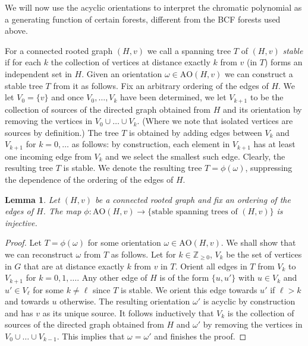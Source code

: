 \documentclass[a4paper,11pt,reqno]{amsart}
\newtheorem{lemma}[corollary]{Lemma}
\numberwithin{equation}{section}
\begin{document}
We will now use the acyclic orientations to interpret the chromatic polynomial as a generating function of certain forests, different from the BCF forests used above.


For a connected rooted graph $(H,v)$ we call a spanning tree $T$ of $(H,v)$ \emph{stable} if for each $k$ the collection of vertices at distance exactly $k$ from $v$ (in $T$) forms an independent set in $H$.
Given an orientation $\omega\in \text{AO}(H,v)$ we can construct a stable tree $T$ from it  as follows.
Fix an arbitrary ordering of the edges of $H$.
We let $V_0=\{v\}$ and once $V_0,\ldots, V_k$ have been determined, we let $V_{k+1}$ to be the collection of sources of the directed graph obtained from $H$ and its orientation by removing the vertices in $V_0\cup \ldots\cup V_k$. (Where we note that isolated vertices are sources by definition.)
The tree $T$ is obtained by adding edges between $V_k$ and $V_{k+1}$ for $k=0,\ldots$ as follows: by construction, each element in $V_{k+1}$ has at least one incoming edge from $V_k$ and we select the smallest such edge.
Clearly, the resulting tree $T$ is stable.
We denote the resulting tree $T=\phi(\omega)$, suppressing the dependence of the ordering of the edges of $H$. 


\begin{lemma}\label{lem:AO --> stable}
Let $(H,v)$ be a connected rooted graph and fix an ordering of the edges of $H$.
The map $\phi:\text{AO}(H,v)\to \{\text{stable spanning trees of } (H,v)\}$ is injective.
\end{lemma}
\begin{proof}
Let $T=\phi(\omega)$ for some orientation $\omega\in\text{AO}(H,v)$. 
We shall show that we can reconstruct $\omega$ from $T$ as follows.
Let for $k\in \mathbb{Z}_{\geq 0}$, $V_k$ be the set of vertices in $G$ that are at distance exactly $k$ from $v$ in $T$.
Orient all edges in $T$ from $V_k$ to $V_{k+1}$ for $k=0,1,\ldots$.
Any other edge of $H$ is of the form $\{u,u'\}$ with $u\in V_k$ and $u'\in V_{\ell}$ for some $k\neq \ell$ since $T$ is stable. We orient this edge towards $u'$ if $\ell>k$ and towards $u$ otherwise. 
The resulting orientation $\omega'$ is acyclic by construction and has $v$ as its unique source.
It follows inductively that $V_{k}$ is the collection of sources of the directed graph obtained from $H$ and $\omega'$ by removing the vertices in $V_0\cup \ldots\cup V_{k-1}$.
This implies that $\omega=\omega'$ and finishes the proof.
\end{proof}
\end{document}

